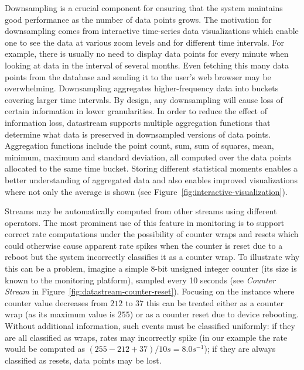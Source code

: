 \documentclass[5p,sort&compress]{elsarticle}
\begin{document}
Downsampling is a crucial component for ensuring that the system maintains good performance as the number of data points grows.
The motivation for downsampling comes from interactive time-series data visualizations which enable one to see the data at various zoom levels and for different time intervals.
For example, there is usually no need to display data points for every minute when looking at data in the interval of several months.
Even fetching this many data points from the database and sending it to the user's web browser may be overwhelming.
Downsampling aggregates higher-frequency data into buckets covering larger time intervals.
By design, any downsampling will cause loss of certain information in lower granularities.
In order to reduce the effect of information loss, datastream supports multiple aggregation functions that determine what data is preserved in downsampled versions of data points.
Aggregation functions include the point count, sum, sum of squares, mean, minimum, maximum and standard deviation, all computed over the data points allocated to the same time bucket.
Storing different statistical moments enables a better understanding of aggregated data and also enables improved visualizations where not only the average is shown (see Figure~\ref{fig:interactive-visualization}).

Streams may be automatically computed from other streams using different operators.
The most prominent use of this feature in monitoring is to support correct rate computations under the possibility of counter wraps and resets which could otherwise cause apparent rate spikes when the counter is reset due to a reboot but the system incorrectly classifies it as a counter wrap.
To illustrate why this can be a problem, imagine a simple 8-bit unsigned integer counter (its size is known to the monitoring platform), sampled every 10 seconds (see \textit{Counter Stream} in Figure~\ref{fig:datastream-counter-reset}).
Focusing on the instance where counter value decreases from $212$ to $37$ this can be treated either as a counter wrap (as its maximum value is $255$) or as a counter reset due to device rebooting.
Without additional information, such events must be classified uniformly: if they are all classified as wraps, rates may incorrectly spike (in our example the rate would be computed as $(255 - 212 + 37) / 10s = 8.0s^{-1}$); if they are always classified as resets, data points may be lost.
\end{document}
